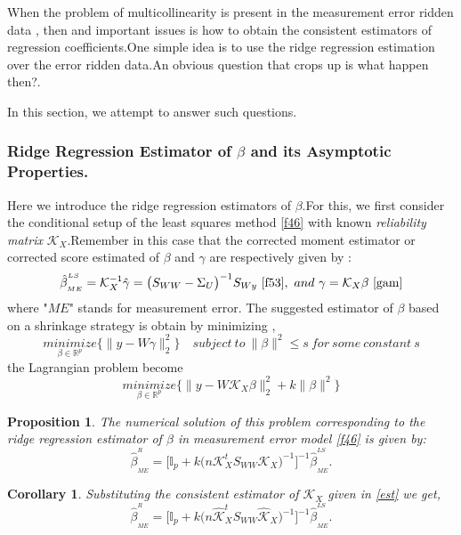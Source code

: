 \documentclass[12pt]{report}
\newtheorem {proposition}{Proposition}[section]  %
\newtheorem{corollaire}{Corollary}
\begin{document}
When the problem of multicollinearity is present in the measurement error ridden data , then and important issues is how to obtain the consistent estimators of regression coefficients.One simple idea is to use the ridge regression estimation over the error ridden data.An obvious question that crops up is what happen then?.

In this section, we attempt to answer such questions.
\subsubsection{Ridge Regression Estimator of $\beta$ and its Asymptotic Properties.}
Here we introduce the ridge regression estimators of $\beta$.For this, we first consider the conditional setup of the least squares method \ref{f46} with known \textit{reliability matrix} $\mathcal{K}_{X}$.Remember in this case that the corrected moment estimator or corrected score estimated of $\beta$  and $\gamma$ are respectively given by :
$$ \hat{\beta}^{^{LS}}_{_{ME}}=\mathcal{K}_{X}^{-1}\hat{\gamma}=\big(S_{WW}-\Sigma_{U}\big)^{-1}S_{Wy}\ \eqref{f53} , \ and\ \gamma=\mathcal{K}_{X}\beta\ \eqref{gam}$$
where "\textbf{$ME$}" stands for measurement error.
The suggested estimator of $\beta$ based on a shrinkage strategy is obtain by minimizing ,
\begin{equation}
	\underset{\beta \in \mathbb{R}^{p}}{minimize} \bigg\{\parallel y- W\gamma \parallel^{2}_{2}\bigg\} \quad subject\ to\ \parallel \beta \parallel^{2}\leq s\ for\ some\ constant\ s
	\label{f56}
\end{equation}
the Lagrangian problem become
\begin{equation}
	\underset{\beta \in \mathbb{R}^{p}}{minimize} \bigg\{ \parallel y- W\mathcal{K}_{X}\beta \parallel^{2}_{2}+k\parallel \beta \parallel^{2}\bigg\}
	\label{f57}
\end{equation} 
\begin{proposition}
	The numerical solution of this problem corresponding to the ridge regression estimator of $\beta$ in measurement error model \ref{f46} is given by:
	\begin{equation}
		\hat{\beta}^{^{R}}_{_{ME}}=\bigg[\mathbb{I}_{p}+k\big(n\mathcal{K}_{X}^{t}S_{WW}\mathcal{K}_{X}\big)^{-1}\bigg]^{-1}\hat{\beta}^{^{LS}}_{_{ME}}.
		\label{f58}
	\end{equation}
\end{proposition}
\begin{corollaire}
	Substituting the consistent estimator of $\mathcal{K}_{X}$ given in \eqref{est} we get,
	\begin{equation}
		\hat{\beta}^{^{R}}_{_{ME}}=\bigg[\mathbb{I}_{p}+k\big(n\hat{\mathcal{K}}_{X}^{t}S_{WW}\hat{\mathcal{K}}_{X}\big)^{-1}\bigg]^{-1}\hat{\beta}^{^{LS}}_{_{ME}}.
		\label{f59}
	\end{equation}
\end{corollaire}
\end{document}
